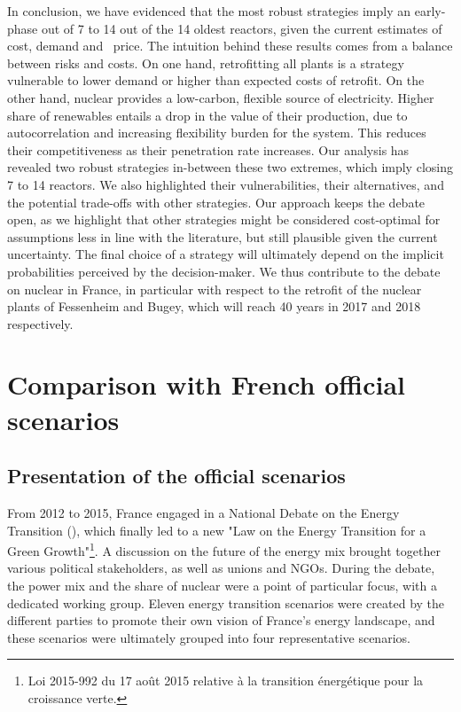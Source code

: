 In conclusion, we have evidenced that the most robust strategies imply an early-phase out of 7 to 14 out of the 14 oldest reactors, given the current estimates of cost, demand and \coo\ price. The intuition behind these results comes from a balance between risks and costs. On one hand, retrofitting all plants is a strategy vulnerable to lower demand or higher than expected costs of retrofit. On the other hand, nuclear provides a low-carbon, flexible source of electricity. Higher share of renewables entails a drop in the value of their production, due to autocorrelation and increasing flexibility burden for the system. This reduces their competitiveness as their penetration rate increases. Our analysis has revealed two robust strategies in-between these two extremes, which imply closing 7 to 14 reactors. 
We also highlighted their vulnerabilities, their alternatives, and the potential trade-offs with other strategies. Our approach keeps the debate open, as we highlight that other strategies might be considered cost-optimal for assumptions less in line with the literature, but still plausible given the current uncertainty. 
The final choice of a strategy will ultimately depend on the implicit probabilities perceived by the decision-maker. We thus contribute to the debate on nuclear in France, in particular with respect to the retrofit of the nuclear plants of Fessenheim and Bugey, which will reach 40 years in 2017 and 2018 respectively.



\section{Comparison with French official scenarios}
\label{sec:comparison}

\subsection{Presentation of the official scenarios}

From 2012 to 2015, France engaged in a National Debate on the Energy Transition (\dnte), which finally led to a new "Law on the Energy Transition for a Green Growth"\footnote{
	Loi 2015-992 du 17 août 2015 relative à la transition énergétique pour la croissance verte.
}.
A discussion on the future of the energy mix brought together various political stakeholders, as well as unions and NGOs.
During the debate, the power mix and the share of nuclear were a point of particular focus, with a dedicated working group. Eleven energy transition scenarios were created by the different parties to promote their own vision of France's energy landscape, and these scenarios were ultimately grouped into four representative scenarios.

